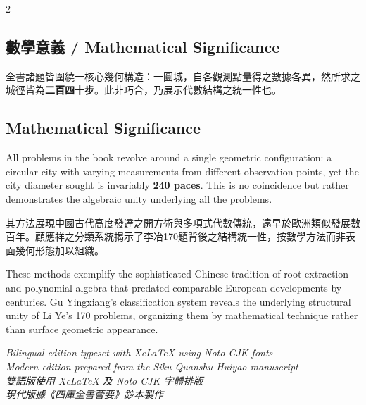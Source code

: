 \documentclass[11pt,a4paper]{article}
\newcounter{problem}[section]
\begin{document}
\begin{paracol}{2}
\switchcolumn

\subsection*{數學意義 / Mathematical Significance}

全書諸題皆圍繞一核心幾何構造：一圓城，自各觀測點量得之數據各異，然所求之城徑皆為\textbf{二百四十步}。此非巧合，乃展示代數結構之統一性也。

\switchcolumn

\subsection*{Mathematical Significance}

All problems in the book revolve around a single geometric configuration: a circular city with varying measurements from different observation points, yet the city diameter sought is invariably \textbf{240 paces}. This is no coincidence but rather demonstrates the algebraic unity underlying all the problems.

\switchcolumn

其方法展現中國古代高度發達之開方術與多項式代數傳統，遠早於歐洲類似發展數百年。顧應祥之分類系統揭示了李冶170題背後之結構統一性，按數學方法而非表面幾何形態加以組織。

\switchcolumn

These methods exemplify the sophisticated Chinese tradition of root extraction and polynomial algebra that predated comparable European developments by centuries. Gu Yingxiang's classification system reveals the underlying structural unity of Li Ye's 170 problems, organizing them by mathematical technique rather than surface geometric appearance.

\end{paracol}

\vspace{1cm}
\begin{flushright}
\textit{Bilingual edition typeset with XeLaTeX using Noto CJK fonts}\\
\textit{Modern edition prepared from the Siku Quanshu Huiyao manuscript}\\
\textit{雙語版使用 XeLaTeX 及 Noto CJK 字體排版}\\
\textit{現代版據《四庫全書薈要》鈔本製作}
\end{flushright}
\end{document}
